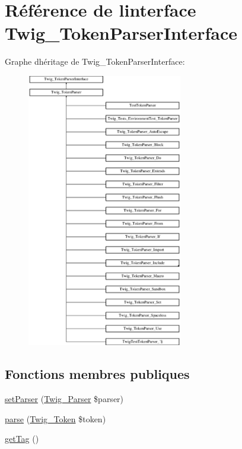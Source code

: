 \hypertarget{interface_twig___token_parser_interface}{}\section{Référence de l\textquotesingle{}interface Twig\+\_\+\+Token\+Parser\+Interface}
\label{interface_twig___token_parser_interface}
Graphe d\textquotesingle{}héritage de Twig\+\_\+\+Token\+Parser\+Interface\+:\begin{figure}[H]
\begin{center}
\leavevmode
\includegraphics[height=12.000000cm]{interface_twig___token_parser_interface}
\end{center}
\end{figure}
\subsection*{Fonctions membres publiques}
\begin{DoxyCompactItemize}
\item 
\hyperlink{interface_twig___token_parser_interface_a68fca2cbecd7ee6643879ae3d5c6f129}{set\+Parser} (\hyperlink{class_twig___parser}{Twig\+\_\+\+Parser} \$parser)
\item 
\hyperlink{interface_twig___token_parser_interface_a5dfa2e269321584fb74e8b43dabe0efd}{parse} (\hyperlink{class_twig___token}{Twig\+\_\+\+Token} \$token)
\item 
\hyperlink{interface_twig___token_parser_interface_ab86ba36154b20e6bbfa3ba705f12f9d6}{get\+Tag} ()
\end{DoxyCompactItemize}



